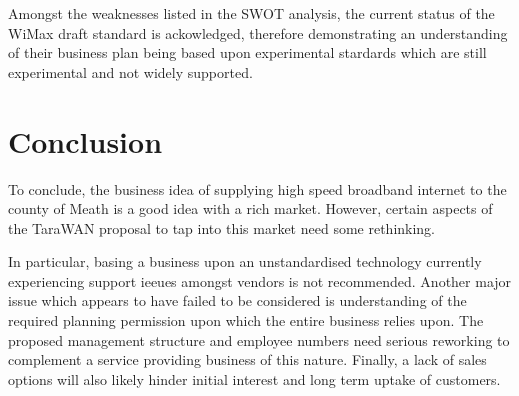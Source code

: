 \documentclass[a4paper,12pt]{article}
\begin{document}
Amongst the weaknesses listed in the SWOT analysis, the current status
of the WiMax draft standard is ackowledged, therefore demonstrating an
understanding of their business plan being based upon experimental
stardards which are still experimental and not widely supported.

\section{Conclusion}

To conclude, the business idea of supplying high speed broadband
internet to the county of Meath is a good idea with a rich market.
However, certain aspects of the TaraWAN proposal to tap into this market
need some rethinking. 


In particular, basing a business upon an unstandardised technology 
currently experiencing support ieeues amongst vendors is not
recommended. Another major issue which appears to have failed to be 
considered is understanding of the required planning permission upon 
which the entire business relies upon. The proposed management structure
and employee numbers need serious reworking to complement a service
providing business of this nature. Finally, a lack of sales options will
also likely hinder initial interest and long term uptake of customers.




\end{document}
